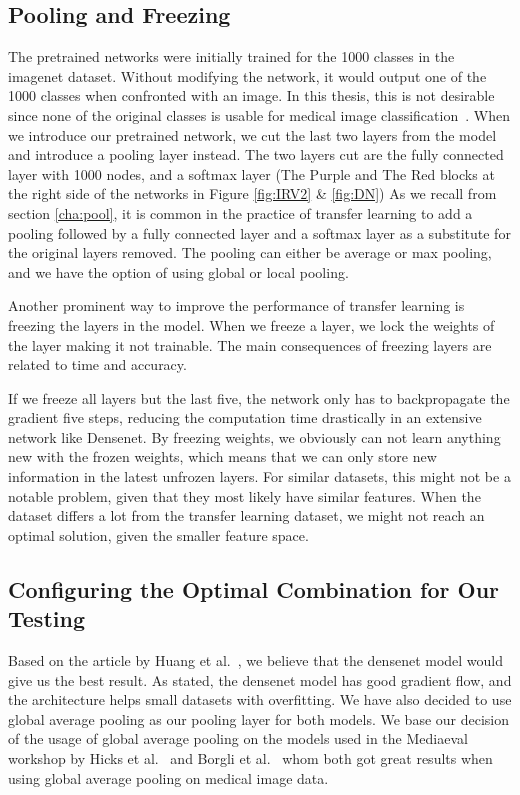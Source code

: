 \subsection{Pooling and Freezing}
The pretrained networks were initially trained for the 1000 classes in the imagenet dataset. Without modifying the network, it would output one of the 1000 classes when confronted with an image. In this thesis, this is not desirable since none of the original classes is usable for medical image classification~\cite{imagenet_cvpr09,imagenet}.
When we introduce our pretrained network, we cut the last two layers from the model and introduce a pooling layer instead.
The two layers cut are the fully connected layer with 1000 nodes, and a softmax layer (The Purple and The Red blocks at the right side of the networks in Figure \ref{fig:IRV2} \& \ref{fig:DN})
As we recall from section \ref{cha:pool}, it is common in the practice of transfer learning to add a pooling followed by a fully connected layer and a softmax layer as a substitute for the original layers removed.  The pooling can either be average or max pooling, and we have the option of using global or local pooling. 

Another prominent way to improve the performance of transfer learning is freezing the layers in the model. When we freeze a layer, we lock the weights of the layer making it not trainable.
The main consequences of freezing layers are related to time and accuracy. 

If we freeze all layers but the last five, the network only has to backpropagate the gradient five steps, reducing the computation time drastically in an extensive network like Densenet. 
By freezing weights, we obviously can not learn anything new with the frozen weights, which means that we can only store new information in the latest unfrozen layers. For similar datasets, this might not be a notable problem, given that they most likely have similar features. When the dataset differs a lot from the transfer learning dataset, we might not reach an optimal solution, given the smaller feature space.





\subsection{Configuring the Optimal Combination for Our Testing}
Based on the article by Huang et al.~\cite{Huang_2017}, we believe that the densenet model would give us the best result. As stated, the densenet model has good gradient flow, and the architecture helps small datasets with overfitting. 
We have also decided to use global average pooling as our pooling layer for both models. We base our decision of the usage of global average pooling on the models used in the Mediaeval workshop by Hicks et al.~\cite{26207} and Borgli et al.~\cite{runeMedico2018} whom both got great results when using global average pooling on medical image data.


